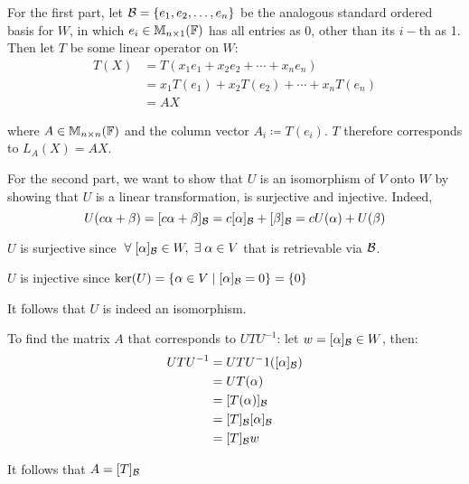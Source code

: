 \documentclass[a4paper, 10pt]{article}
\begin{document}
\begin{solution}
    For the first part, let \(\mathcal{B} = \{e_1, e_2, \dots, e_n\}\) be the analogous standard ordered basis for \(W\), in which \(e_i \in \mathbb{M}_{n \times 1}(\mathbb{F})\) has all entries as 0, other than its \(i-\)th as 1. Then let \(T\) be some linear operator on \(W\):
    \begin{align*}
        T(X) & = T(x_1 e_1 + x_2 e_2 + \cdots + x_n e_n)       \\
             & = x_1 T(e_1) + x_2 T(e_2) + \cdots + x_n T(e_n) \\
             & = AX
    \end{align*}

    where \(A \in \mathbb{M}_{n \times n}(\mathbb{F})\) and the column vector \(A_i \coloneqq T(e_i)\). \(T\) therefore corresponds to \(L_A(X) = AX\).

    For the second part, we want to show that \(U\) is an isomorphism of \(V\) onto \(W\) by showing that \(U\) is a linear transformation, is surjective and injective. Indeed, \[
        U(c\alpha + \beta) = [c\alpha+\beta]_{\mathcal{B}} = c[\alpha]_{\mathcal{B}} + [\beta]_{\mathcal{B}} = cU(\alpha) + U(\beta)
    \]

    \(U\) is surjective since \(\forall [\alpha]_\cab \in W, \exists \alpha \in V\) that is retrievable via \(\mathcal{B}\).

    \(U\) is injective since \(\ker(U) = \{\alpha \in V \mid [\alpha]_{\mathcal{B}} = 0\} = \{0\}\)

    It follows that \(U\) is indeed an isomorphism.

    To find the matrix \(A\) that corresponds to \(UTU^{-1}\): let \(w = [\alpha]_{\mathcal{B}} \in W\), then:
    \begin{align*}
        UTU^{-1} & = UTU^-1([\alpha]_{\mathcal{B}})  \\
                 & = UT(\alpha)             \\
                 & = [T(\alpha)]_{\mathcal{B}}       \\
                 & = [T]_{\mathcal{B}} [\alpha]_{\mathcal{B}} \\
                 & = [T]_{\mathcal{B}} w
    \end{align*}

    It follows that \(A = [T]_{\mathcal{B}}\)
\end{solution}
\end{document}
